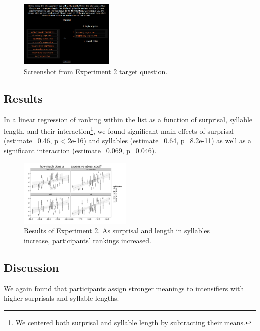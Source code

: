 \documentclass[10pt,letterpaper]{article}
\begin{document}
\begin{figure}[ht]
\begin{center}
\includegraphics[width=0.4\textwidth]{analysis_files_for_writeup/images/exp2-q.png}
\end{center}
\caption{Screenshot from Experiment 2 target question.} 
\label{exp2-q}
\end{figure}

\subsection{Results}

In a linear regression of ranking within the list as a function of surprisal, syllable length, and their interaction\footnote{We centered both surprisal and syllable length by subtracting their means.}, we found significant main effects of surprisal (estimate=0.46, p$<$2e-16) and syllables (estimate=0.64, p=8.2e-11) as well as a significant interaction (estimate=0.069, p=0.046).

\begin{figure}[ht]
\begin{center}
\includegraphics[width=0.48\textwidth]{analysis_files_for_writeup/images/exp2-plot.png}
\end{center}
\caption{Results of Experiment 2. As surprisal and length in syllables increase, participants' rankings increased.} 
\label{exp2-plot}
\end{figure}

\subsection{Discussion}

We again found that participants assign stronger meanings to intensifiers with higher surprisals and syllable lengths.
\end{document}
